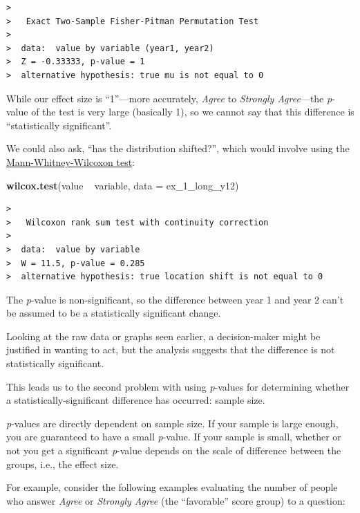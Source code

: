 \documentclass[]{book}
\newenvironment{Shaded}{\begin{snugshade}}{\end{snugshade}}
\newcommand{\KeywordTok}[1]{\textcolor[rgb]{0.13,0.29,0.53}{\textbf{{#1}}}}
\newcommand{\DataTypeTok}[1]{\textcolor[rgb]{0.13,0.29,0.53}{{#1}}}
\newcommand{\StringTok}[1]{\textcolor[rgb]{0.31,0.60,0.02}{{#1}}}
\newcommand{\NormalTok}[1]{{#1}}
\begin{document}
\begin{verbatim}
>  
>   Exact Two-Sample Fisher-Pitman Permutation Test
>  
>  data:  value by variable (year1, year2)
>  Z = -0.33333, p-value = 1
>  alternative hypothesis: true mu is not equal to 0
\end{verbatim}

While our effect size is ``1''---more accurately, \emph{Agree} to
\emph{Strongly Agree}---the \emph{p}-value of the test is very large
(basically 1), so we cannot say that this difference is ``statistically
significant''.

We could also ask, ``has the distribution shifted?'', which would
involve using the
\href{https://en.wikipedia.org/wiki/Mann\%E2\%80\%93Whitney_U_test}{Mann-Whitney-Wilcoxon
test}:

\begin{Shaded}
\begin{Highlighting}[]
\KeywordTok{wilcox.test}\NormalTok{(value ~}\StringTok{ }\NormalTok{variable, }\DataTypeTok{data =} \NormalTok{ex_1_long_y12) }
\end{Highlighting}
\end{Shaded}

\begin{verbatim}
>  
>   Wilcoxon rank sum test with continuity correction
>  
>  data:  value by variable
>  W = 11.5, p-value = 0.285
>  alternative hypothesis: true location shift is not equal to 0
\end{verbatim}

The \emph{p}-value is non-significant, so the difference between year 1
and year 2 can't be assumed to be a statistically significant change.

Looking at the raw data or graphs seen earlier, a decision-maker might
be justified in wanting to act, but the analysis suggests that the
difference is not statistically significant.

This leads us to the second problem with using \emph{p}-values for
determining whether a statistically-significant difference has occurred:
sample size.

\emph{p}-values are directly dependent on sample size. If your sample is
large enough, you are guaranteed to have a small \emph{p}-value. If your
sample is small, whether or not you get a significant \emph{p}-value
depends on the scale of difference between the groups, i.e., the effect
size.

For example, consider the following examples evaluating the number of
people who answer \emph{Agree} or \emph{Strongly Agree} (the
``favorable'' score group) to a question:
\end{document}
